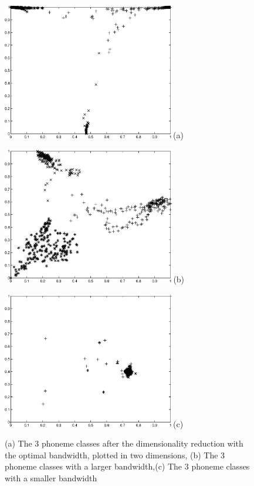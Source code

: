 \documentclass[12pt,letterpaper,doublespaced,ETD,dvips,proposal]{gtthesis}
\begin{document}
\begin{Body}
\begin{figure}[tb]
 \centerline{\includegraphics[height=6cm]{fig4a.eps}(a)}
 \centerline{\includegraphics[height=6cm]{fig4c.eps}(b)}
\centerline{\includegraphics[height=6cm]{fig4e.eps}(c)}
 \caption{(a) The 3 phoneme classes after the dimensionality reduction
with the optimal bandwidth, plotted in two dimensions, (b) The 3
phoneme classes with a larger bandwidth,(c) The 3 phoneme classes
with a smaller bandwidth}
  \label{fig4}
\end{figure}


\end{Body}
\end{document}
